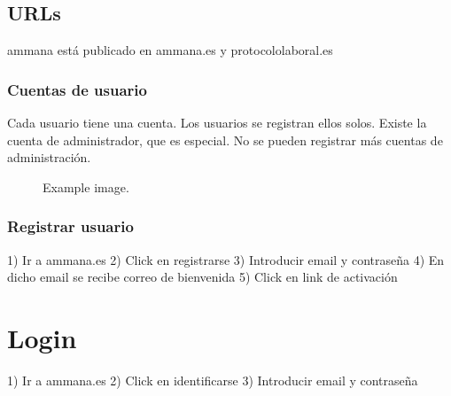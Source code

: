 \documentclass[12pt, spanish]{article}
\begin{document}

    \subsection{URLs}

    ammana está publicado en ammana.es y protocololaboral.es


    \subsubsection{Cuentas de usuario}

    Cada usuario tiene una cuenta.
    Los usuarios se registran ellos solos.
    Existe la cuenta de administrador, que es especial. No se pueden registrar más cuentas de administración.

    \begin{figure}[H] %
    \caption{Example image.}
    \label{fig:speciation}
    \end{figure}


    \subsubsection{Registrar usuario}

    1) Ir a ammana.es
    2) Click en registrarse
    3) Introducir email y contraseña
    4) En dicho email se recibe correo de bienvenida
    5) Click en link de activación


    \section{Login}

    1) Ir a ammana.es
    2) Click en identificarse
    3) Introducir email y contraseña
\end{document}
